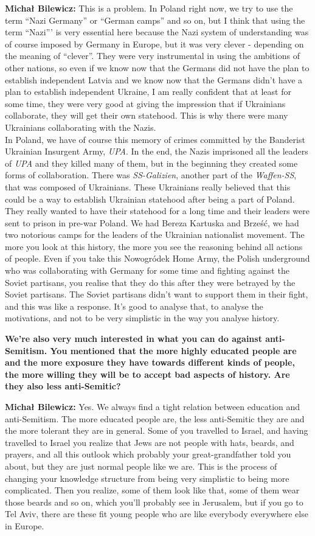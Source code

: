 \textbf{Michał Bilewicz:} This is a problem. In Poland right now, we try to use the term ``Nazi Germany'' or ``German camps'' and so on, but I think that using the term ``Nazi''' is very essential here because the Nazi system of understanding was of course imposed by Germany in Europe, but it was very clever - depending on the meaning of ``clever''. They were very instrumental in using the ambitions of other nations, so even if we know now that the Germans did not have the plan to establish independent Latvia and we know now that the Germans didn't have a plan to establish independent Ukraine, I am really confident that at least for some time, they were very good at giving the impression that if Ukrainians collaborate, they will get their own statehood. This is why there were many Ukrainians collaborating with the Nazis.\\
In Poland, we have of course this memory of crimes committed by the Banderist Ukrainian Insurgent Army, \textit{UPA}. In the end, the Nazis imprisoned all the leaders of \textit{UPA} and they killed many of them, but in the beginning they created some forms of collaboration. There was \textit{SS-Galizien}, another part of the \textit{Waffen-SS}, that was composed of Ukrainians. These Ukrainians really believed that this could be a way to establish Ukrainian statehood after being a part of Poland. They really wanted to have their statehood for a long time and their leaders were sent to prison in pre-war Poland. We had Bereza Kartuska and Brześć, we had two notorious camps for the leaders of the Ukrainian nationalist movement. The more you look at this history, the more you see the reasoning behind all actions of people. Even if you take this Nowogródek Home Army, the Polish underground who was collaborating with Germany for some time and fighting against the Soviet partisans, you realise that they do this after they were betrayed by the Soviet partisans. The Soviet partisans didn't want to support them in their fight, and this was like a response. It's good to analyse that, to analyse the motivations, and not to be very simplistic in the way you analyse history. 

\textbf{We’re also very much interested in what you can do against anti-Semitism. You mentioned that the more highly educated people are and the more exposure they have towards different kinds of people, the more willing they will be to accept bad aspects of history. Are they also less anti-Semitic?} 

\textbf{Michał Bilewicz:} Yes. We always find a tight relation between education and anti-Semitism. The more educated people are, the less anti-Semitic they are and the more tolerant they are in general. Some of you travelled to Israel, and having travelled to Israel you realize that Jews are not people with hats, beards, and prayers, and all this outlook which probably your great-grandfather told you about, but they are just normal people like we are. This is the process of changing your knowledge structure from being very simplistic to being more complicated. Then you realize, some of them look like that, some of them wear those beards and so on, which you'll probably see in Jerusalem, but if you go to Tel Aviv, there are these fit young people who are like everybody everywhere else in Europe. 

